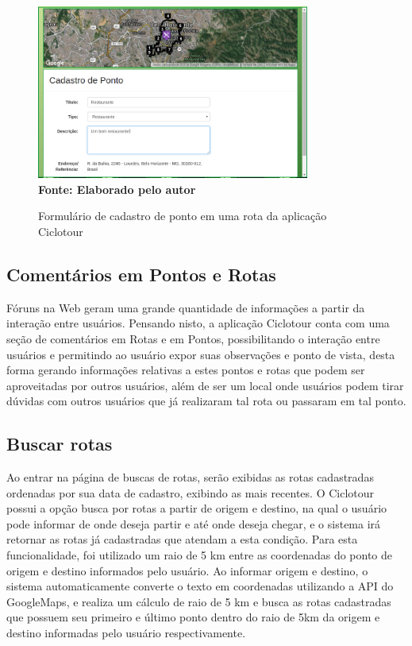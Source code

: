 \begin{figure}[!ht]
	\centering	
	\caption[\hspace{0.1cm} Cadastro de Pontos em Rotas da aplicação Ciclotour.]
	{Formulário de cadastro de ponto em uma rota da aplicação Ciclotour}
	  \vspace{-0.4cm}
	\includegraphics[width=0.8\textwidth]{figuras/cadastroPonto.png}
	 \vspace{0cm}
	\\\textbf{\footnotesize Fonte: Elaborado pelo autor}
	\label{fig:cadastroPonto}
\end{figure}

\subsection{Comentários em Pontos e Rotas}
Fóruns na Web geram uma grande quantidade de informações a partir da interação entre usuários. Pensando nisto, a aplicação Ciclotour conta com uma 
seção de comentários em Rotas e em Pontos, possibilitando o interação entre usuários e permitindo ao usuário expor suas observações e ponto de 
vista, desta forma gerando informações relativas a estes pontos e rotas que podem ser aproveitadas por outros usuários, além de ser um local onde 
usuários podem tirar dúvidas com outros usuários que já realizaram tal rota ou passaram em tal ponto.

\subsection{Buscar rotas}
Ao entrar na página de buscas de rotas, serão exibidas as rotas cadastradas ordenadas por sua data de cadastro, exibindo as mais recentes.
O Ciclotour possui a opção busca por rotas a partir de origem e destino, na qual o usuário pode informar de onde deseja partir e até onde deseja 
chegar, e o sistema irá retornar as rotas já cadastradas que atendam a esta condição. Para esta funcionalidade, foi utilizado um raio de 5 km entre 
as coordenadas do ponto de origem e destino informados pelo usuário. Ao informar origem e destino, o sistema automaticamente converte o texto em 
coordenadas utilizando a API do GoogleMaps, e realiza um cálculo de raio de 5 km e busca as rotas cadastradas que possuem seu primeiro e último ponto
dentro do raio de 5km da origem e destino informadas pelo usuário respectivamente.

